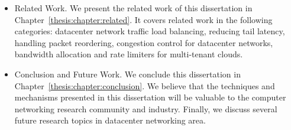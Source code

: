 \begin{itemize}
\item Related Work. We present the related work of this dissertation in Chapter~\ref{thesis:chapter:related}. 
It covers related work in the following categories: datacenter network traffic load balancing, 
reducing tail latency, handling packet reordering, congestion control for datacenter networks, 
bandwidth allocation and rate limiters for multi-tenant clouds.

\item Conclusion and Future Work. We conclude this dissertation in Chapter~\ref{thesis:chapter:conclusion}. 
We believe that the techniques and mechanisms presented in this dissertation 
will be valuable to the computer networking research community and industry. 
Finally, we discuss several future research topics in datacenter networking area. 
\end{itemize}


